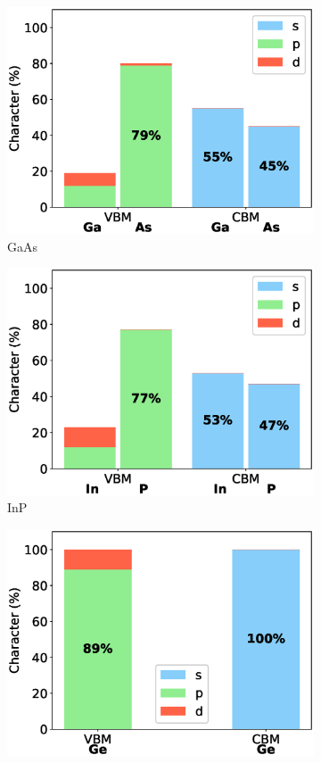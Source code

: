 \begin{figure}[!ht]
\begin{subfigure}{0.3\textwidth}
  \includegraphics[width=\linewidth]{images/gaas_3d_composition.eps}
  \caption{GaAs}
\end{subfigure}\hfil %
\medskip
\begin{subfigure}{0.3\textwidth}
  \includegraphics[width=\linewidth]{images/inp_3d_composition.eps}
  \caption{InP}
\end{subfigure}\hfil %
\begin{subfigure}{0.3\textwidth}
  \includegraphics[width=\linewidth]{images/ge_3d_composition.eps}

\end{subfigure}
\end{figure}
